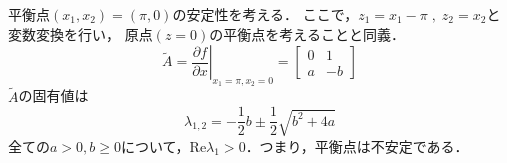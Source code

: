 \documentclass{jsarticle}
\begin{document}
平衡点$(x_1,x_2)=(\pi,0)$の安定性を考える．
ここで，$z_1=x_1-\pi\;,\;z_2=x_2$と変数変換を行い，
原点$(z=0)$の平衡点を考えることと同義．
\begin{equation*}
  \tilde{A} = \left.\frac{\partial f}{\partial x} \right|_{x_1=\pi,x_2=0} = \left[
    \begin{matrix}
      0&1\\ a&-b
    \end{matrix}
  \right]
\end{equation*}
$\tilde{A}$の固有値は
\begin{equation*}
  \lambda_{1,2} = -\frac{1}{2}b \pm \frac{1}{2}\sqrt{b^2+4a}
\end{equation*}
全ての$a>0,b\geq0$について，$\text{Re}{\lambda_1}>0$．つまり，平衡点は不安定である．
\end{document}
